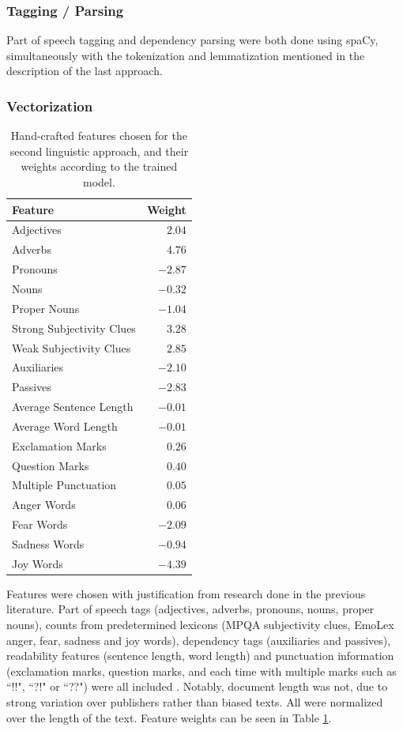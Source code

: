 \documentclass[11pt, a4paper]{article}
\begin{document}
\subsubsection{Tagging / Parsing}

Part of speech tagging and dependency parsing were both done using spaCy, simultaneously with the tokenization and lemmatization mentioned in the description of the last approach.

\subsubsection{Vectorization}

\begin{table}[t]
\centering
\begin{tabular}{|l||r|}
\hline \bf Feature & \bf Weight \\ \hline
Adjectives & $2.04$ \\
Adverbs & $4.76$ \\
Pronouns & $-2.87$ \\
Nouns & $-0.32$ \\
Proper Nouns & $-1.04$ \\
Strong Subjectivity Clues & $3.28$ \\
Weak Subjectivity Clues & $2.85$ \\
Auxiliaries & $-2.10$ \\
Passives & $-2.83$ \\
Average Sentence Length & $-0.01$ \\
Average Word Length & $-0.01$ \\
Exclamation Marks & $0.26$ \\
Question Marks & $0.40$ \\
Multiple Punctuation & $0.05$ \\
Anger Words & $0.06$ \\
Fear Words & $-2.09$ \\
Sadness Words & $-0.94$ \\
Joy Words & $-4.39$ \\
\hline
\end{tabular}
\caption{\label{hc-features} Hand-crafted features chosen for the second linguistic approach, and their weights according to the trained model. }
\end{table}

Features were chosen with justification from research done in the previous literature. Part of speech tags (adjectives, adverbs, pronouns, nouns, proper nouns), counts from predetermined lexicons (MPQA subjectivity clues, EmoLex anger, fear, sadness and joy words), dependency tags (auxiliaries and passives), readability features (sentence length, word length) and punctuation information (exclamation marks, question marks, and each time with multiple marks such as ``!!", ``?!" or ``??") were all included \cite{wilson2005recognizing} \cite{Mohammad13}. Notably, document length was not, due to strong variation over publishers rather than biased texts. All were normalized over the length of the text. Feature weights can be seen in Table \ref{hc-features}.
\end{document}
